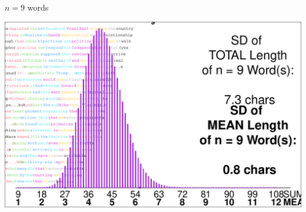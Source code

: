 \documentclass[10pt]{beamer}\usepackage[]{graphicx}\usepackage[]{color}
\makeatletter
\def\maxwidth{ %
  \ifdim\Gin@nat@width>\linewidth
    \linewidth
  \else
    \Gin@nat@width
  \fi
}
\newenvironment{knitrout}{}{} %
\makeatother
\begin{document}
\begin{frame}[fragile]{$n = 9$ words}
\begin{knitrout}\tiny
{}\color{fgcolor}

{\centering \includegraphics[width=\maxwidth]{figure/unnamed-chunk-14-1} 

}


\end{knitrout}
\end{frame}
\end{document}
